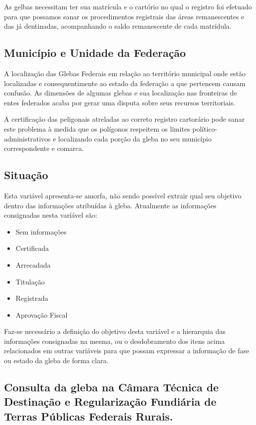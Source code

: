 \documentclass[
  letterpaper,
]{report}
\providecommand{\tightlist}{%
  \setlength{\itemsep}{0pt}\setlength{\parskip}{0pt}}\usepackage{longtable,booktabs,array}
\begin{document}
As gelbas necessitam ter sua matrícula e o cartório no qual o registro
foi efetuado para que possamos sanar os procedimentos registrais das
áreas remanescentes e das já dentinadas, acompanhando o saldo
remanescente de cada matrídula.

\hypertarget{municuxedpio-e-unidade-da-federauxe7uxe3o}{%
\subsection{Município e Unidade da
Federação}\label{municuxedpio-e-unidade-da-federauxe7uxe3o}}

A localização das Glebas Federais em relação ao território municipal
onde estão localizadas e consequentimente ao estado da federação a que
pertencem causam confusão. As dimensões de algumas glebas e sua
localização nas fronteiras de entes federados acaba por gerar uma
disputa sobre seus recursos territoriais.

A certificação das peligonais atreladas ao correto registro cartorário
pode sanar este problema à medida que os polígonos respeitem os limites
político-administrativos e localizando cada porção da gleba no seu
município correspondente e comarca.

\hypertarget{situauxe7uxe3o}{%
\subsection{Situação}\label{situauxe7uxe3o}}

Esta variável apresenta-se amorfa, não sendo possível extrair qual seu
objetivo dentro das informações atribuídas à gleba. Atualmente as
informações consignadas nesta varíável são:

\begin{itemize}
\tightlist
\item
  Sem informações
\item
  Certificada
\item
  Arrecadada
\item
  Titulação
\item
  Registrada
\item
  Aprovação Fiscal
\end{itemize}

Faz-se necessário a definição do objetivo desta variável e a hierarquia
das informações consignadas na mesma, ou o desdobramento dos itens acima
relacionados em outras variáveis para que possam expressar a informação
de fase ou estado da gleba de forma clara.

\hypertarget{consulta-da-gleba-na-cuxe2mara-tuxe9cnica-de-destinauxe7uxe3o-e-regularizauxe7uxe3o-fundiuxe1ria-de-terras-puxfablicas-federais-rurais.}{%
\subsection{Consulta da gleba na Câmara Técnica de Destinação e
Regularização Fundiária de Terras Públicas Federais
Rurais.}\label{consulta-da-gleba-na-cuxe2mara-tuxe9cnica-de-destinauxe7uxe3o-e-regularizauxe7uxe3o-fundiuxe1ria-de-terras-puxfablicas-federais-rurais.}}
\end{document}
